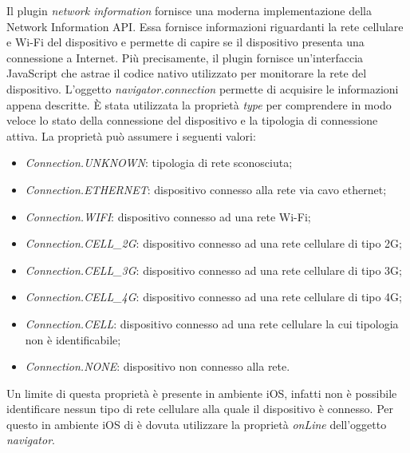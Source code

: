 Il plugin \textit{network information} fornisce una moderna implementazione della Network Information API. Essa fornisce informazioni riguardanti la rete cellulare e Wi-Fi del dispositivo e permette di capire se il dispositivo presenta una connessione a Internet. Più precisamente, il plugin fornisce un'interfaccia JavaScript che astrae il codice nativo utilizzato per monitorare la rete del dispositivo. L'oggetto \textit{navigator.connection} permette di acquisire le informazioni appena descritte. È stata utilizzata la proprietà \textit{type} per comprendere in modo veloce lo stato della connessione del dispositivo e la tipologia di connessione attiva. La proprietà può assumere i seguenti valori:
\begin{itemize}
	\item \textit{Connection.UNKNOWN}: tipologia di rete sconosciuta;
	\item \textit{Connection.ETHERNET}: dispositivo connesso alla rete via cavo ethernet;
	\item \textit{Connection.WIFI}: dispositivo connesso ad una rete Wi-Fi;
	\item \textit{Connection.CELL\_2G}: dispositivo connesso ad una rete cellulare di tipo 2G;
	\item \textit{Connection.CELL\_3G}: dispositivo connesso ad una rete cellulare di tipo 3G;
	\item \textit{Connection.CELL\_4G}: dispositivo connesso ad una rete cellulare di tipo 4G;
	\item \textit{Connection.CELL}: dispositivo connesso ad una rete cellulare la cui tipologia non è identificabile;
	\item \textit{Connection.NONE}: dispositivo non connesso alla rete.
\end{itemize}
Un limite di questa proprietà è presente in ambiente iOS, infatti non è possibile identificare nessun tipo di rete cellulare alla quale il dispositivo è connesso. Per questo in ambiente iOS di è dovuta utilizzare la proprietà \textit{onLine} dell'oggetto \textit{navigator}.

